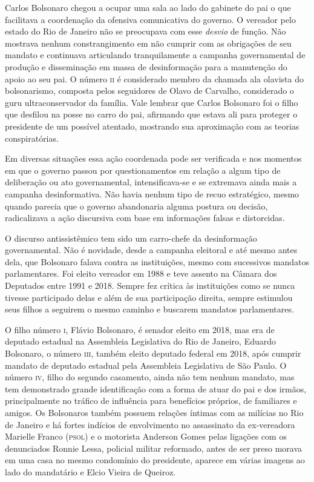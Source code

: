Carlos Bolsonaro chegou a ocupar uma sala ao lado do gabinete do pai o
que facilitava a coordenação da ofensiva comunicativa do governo. O
vereador pelo estado do Rio de Janeiro não se preocupava com esse
\textit{desvio} de função. Não mostrava nenhum constrangimento em não cumprir
com as obrigações de seu mandato e continuava articulando tranquilamente
a campanha governamental de produção e disseminação em massa de
desinformação para a manutenção do apoio ao seu pai. O número \textsc{ii} é
considerado membro da chamada ala olavista do bolsonarismo, composta
pelos seguidores de Olavo de Carvalho, considerado o guru
ultraconservador da família. Vale lembrar que Carlos Bolsonaro foi o
filho que desfilou na posse no carro do pai, afirmando que estava ali
para proteger o presidente de um possível atentado, mostrando sua
aproximação com as teorias conspiratórias.

Em diversas situações essa ação coordenada pode ser verificada e nos
momentos em que o governo passou por questionamentos em relação a algum
tipo de deliberação ou ato governamental, intensificava-se e se
extremava ainda mais a campanha desinformativa. Não havia nenhum tipo de
recuo estratégico, mesmo quando parecia que o governo abandonaria alguma
postura ou decisão, radicalizava a ação discursiva com base em
informações falsas e distorcidas.

O discurso antissistêmico tem sido um carro-chefe da desinformação
governamental. Não é novidade, desde a campanha eleitoral e até mesmo
antes dela, que Bolsonaro falava contra as instituições, mesmo com
sucessivos mandatos parlamentares. Foi eleito vereador em 1988 e teve
assento na Câmara dos Deputados entre 1991 e 2018. Sempre fez crítica às
instituições como se nunca tivesse participado delas e além de sua
participação direita, sempre estimulou seus filhos a seguirem o mesmo
caminho e buscarem mandatos parlamentares.

O filho número \textsc{i}, Flávio Bolsonaro, é senador eleito em 2018, mas era de
deputado estadual na Assembleia Legislativa do Rio de Janeiro,
Eduardo Bolsonaro, o número \textsc{iii}, também eleito deputado federal em 2018,
após cumprir mandato de deputado estadual pela Assembleia Legislativa de São Paulo. 
O número \textsc{iv}, filho do segundo casamento, ainda não
tem nenhum mandato, mas tem demonstrado grande identificação com a forma
de atuar do pai e dos irmãos, principalmente no tráfico de influência
para benefícios próprios, de familiares e amigos. Os Bolsonaros também
possuem relações íntimas com as milícias no Rio de Janeiro e há fortes
indícios de envolvimento no assassinato da ex-vereadora Marielle Franco
(\textsc{psol}) e o motorista Anderson Gomes pelas ligações com os denunciados
Ronnie Lessa, policial militar reformado, antes de ser preso morava em
uma casa no mesmo condomínio do presidente, aparece em várias imagens ao
lado do mandatário e Elcio Vieira de Queiroz.

